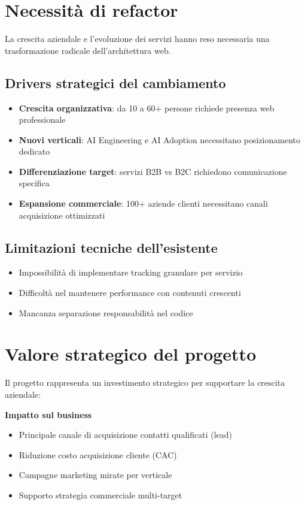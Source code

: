 \section{Necessità di refactor}
La crescita aziendale e l'evoluzione dei servizi hanno reso necessaria 
una trasformazione radicale dell'architettura web.

\subsection{Drivers strategici del cambiamento}
\begin{itemize}
  \item \textbf{Crescita organizzativa}: da 10 a 60+ persone 
        richiede presenza web professionale
  \item \textbf{Nuovi verticali}: AI Engineering e AI Adoption 
        necessitano posizionamento dedicato
  \item \textbf{Differenziazione target}: servizi B2B vs B2C richiedono 
        comunicazione specifica
  \item \textbf{Espansione commerciale}: 100+ aziende clienti necessitano 
        canali acquisizione ottimizzati
\end{itemize}

\subsection{Limitazioni tecniche dell'esistente}
\begin{itemize}
  \item Impossibilità di implementare tracking granulare per servizio
  \item Difficoltà nel mantenere performance con contenuti crescenti
  \item Mancanza separazione responsabilità nel codice
\end{itemize}

\section{Valore strategico del progetto}
Il progetto rappresenta un investimento strategico per supportare la 
crescita aziendale:

\textbf{Impatto sul business}
\begin{itemize}
  \item Principale canale di acquisizione contatti qualificati (lead)
  \item Riduzione costo acquisizione cliente (CAC)
  \item Campagne marketing mirate per verticale
  \item Supporto strategia commerciale multi-target
\end{itemize}

